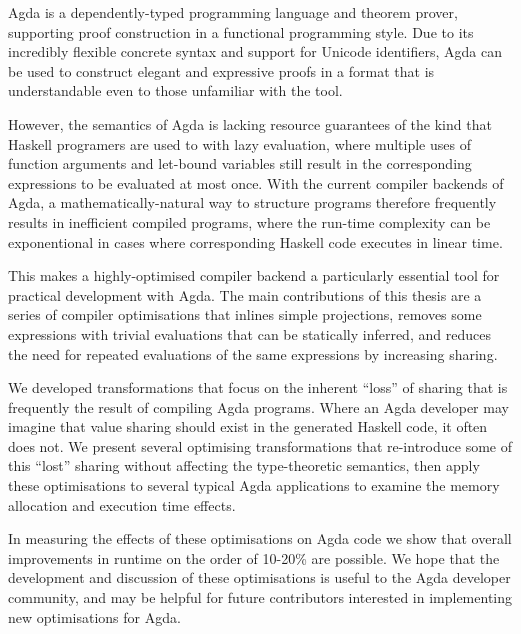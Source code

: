 Agda is a dependently-typed programming language and theorem prover,
supporting proof construction in a functional programming style.
Due to its incredibly flexible concrete syntax and support for Unicode
identifiers, Agda can be used to construct elegant and expressive
proofs in a format that is understandable even to those unfamiliar
with the tool.

However, the semantics of Agda is lacking resource guarantees
of the kind that Haskell programers are used to with lazy evaluation,
where multiple uses of function arguments and let-bound variables
still result in the corresponding expressions to be evaluated at most
once.
With the current compiler backends of Agda,
a mathematically-natural way to structure programs
therefore frequently results in inefficient compiled programs,
where the run-time complexity can be exponentional in cases where
corresponding Haskell code executes in linear time.

This makes a highly-optimised compiler backend a particularly
essential tool for practical development with Agda.
The main contributions of this thesis are a series of compiler
optimisations that inlines simple projections, removes some
expressions with trivial evaluations that can be statically inferred,
and reduces the need for repeated evaluations of the same expressions
by increasing sharing.

We developed transformations that focus on the inherent ``loss'' of sharing
that is frequently the result of compiling Agda programs. Where an Agda
developer may imagine that value sharing should exist in the generated Haskell
code, it often does not.
We present several optimising transformations that re-introduce some of this
``lost'' sharing without affecting the type-theoretic semantics, then apply
these optimisations to several typical Agda applications to examine the
memory allocation and execution time effects.

In measuring the effects of these optimisations
on Agda code we show that overall improvements in runtime on the order
of 10-20\% are possible.
We hope that the development and discussion of these optimisations is
useful to the Agda developer community, and may be helpful for future
contributors interested in implementing new optimisations for Agda.
